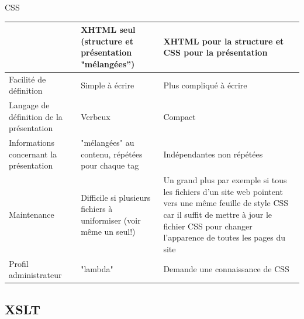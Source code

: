 \begin{frame}{CSS}
\begin{tabular}{| p{3cm} | p{3.5cm} | p{3.5cm} |}
\hline
&
XHTML seul (structure et pr\'esentation "m\'elang\'ees'')
& 
XHTML pour la structure et CSS pour la pr\'esentation\\
\hline
Facilit\'e de d\'efinition & Simple à \'ecrire & Plus compliqu\'e à \'ecrire\\
\hline
Langage de d\'efinition de la pr\'esentation & Verbeux & Compact \\
\hline
Informations concernant la pr\'esentation & "m\'elang\'ees" au contenu, r\'ep\'et\'ees pour chaque tag & Ind\'ependantes non r\'ep\'et\'ees \\
\hline
Maintenance & Difficile si plusieurs fichiers \`a uniformiser (voir m\^eme un seul!) & 
Un grand plus par exemple si tous les fichiers d'un site web pointent vers une m\^eme feuille de style CSS car il suffit de mettre à jour le fichier CSS pour changer l'apparence de toutes les pages du site\\
\hline
Profil administrateur & "lambda" & Demande une connaissance de CSS\\ 
\hline

\end{tabular}

\end{frame}

\subsection{XSLT}

